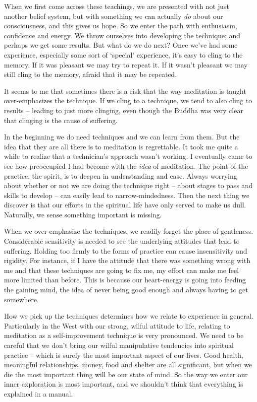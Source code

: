 When we first come across these teachings, we are presented with not
just another belief system, but with something we can actually \emph{do}
about our consciousness, and this gives us hope. So we enter the path
with enthusiasm, confidence and energy. We throw ourselves into
developing the technique; and perhaps we get some results. But what do
we do next? Once we’ve had some experience, especially some sort of
‘special’ experience, it’s easy to cling to the memory. If it was
pleasant we may try to repeat it. If it wasn’t pleasant we may still
cling to the memory, afraid that it may be repeated.

It seems to me that sometimes there is a risk that the way meditation is
taught over-emphasizes the technique. If we cling to a technique, we
tend to also cling to results – leading to just more clinging, even
though the Buddha was very clear that clinging is the cause of
suffering.

In the beginning we do need techniques and we can learn from them. But
the idea that they are all there is to meditation is regrettable. It
took me quite a while to realize that a technician’s approach wasn’t
working. I eventually came to see how preoccupied I had become with the
\emph{idea} of meditation. The point of the practice, the spirit, is to
deepen in understanding and ease. Always worrying about whether or not
we are doing the technique right – about stages to pass and skills to
develop – can easily lead to narrow-mindedness. Then the next thing we
discover is that our efforts in the spiritual life have only served to
make us dull. Naturally, we sense something important is missing.

When we over-emphasize the techniques, we readily forget the place of
gentleness. Considerable sensitivity is needed to see the underlying
attitudes that lead to suffering. Holding too firmly to the forms of
practice can cause insensitivity and rigidity. For instance, if I have
the attitude that there was something wrong with me and that these
techniques are going to fix me, my effort can make me feel more limited
than before. This is because our heart-energy is going into feeding the
gaining mind, the idea of never being good enough and always having to
get somewhere.

How we pick up the techniques determines how we relate to experience in
general. Particularly in the West with our strong, wilful attitude to
life, relating to meditation as a self-improvement technique is very
pronounced. We need to be careful that we don’t bring our wilful
manipulative tendencies into spiritual practice – which is surely the
most important aspect of our lives. Good health, meaningful
relationships, money, food and shelter are all significant, but when we
die the most important thing will be our state of mind. So the way we
enter our inner exploration is most important, and we shouldn’t think
that everything is explained in a manual.

